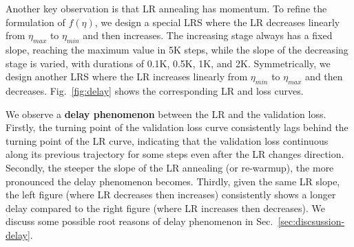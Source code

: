 Another key observation is that LR annealing has momentum.
To refine the formulation of $f(\eta)$,
we design a special LRS where the LR decreases linearly from $\eta_{max}$ to $\eta_{min}$ and then increases.
The increasing stage always has a fixed slope, reaching the maximum value in 5K steps, while the slope of the decreasing stage is varied, with durations of 0.1K, 0.5K, 1K, and 2K. 
Symmetrically, we design another LRS where the LR increases linearly from $\eta_{min}$ to $\eta_{max}$ and then decreases. Fig.~\ref{fig:delay} shows the corresponding LR and loss curves.

We observe a \textbf{delay phenomenon} between the LR and the validation loss. Firstly, the turning point of the validation loss curve consistently lags behind the turning point of the LR curve, indicating that the validation loss continuous along its previous trajectory for some steps even after the LR changes direction. Secondly, the steeper the slope of the LR annealing (or re-warmup), the more pronounced the delay phenomenon becomes. 
Thirdly, given the same LR slope, the left figure (where LR decreases then increases) consistently shows a longer delay compared to the right figure (where LR increases then decreases). We discuss some possible root reasons of delay phenomenon in Sec.~\ref{sec:discsussion-delay}.

